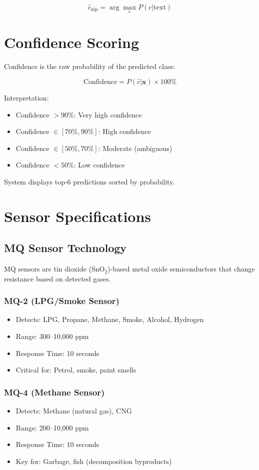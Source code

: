 \documentclass[10pt]{article}
\begin{document}
\[
\hat{c}_{\text{nlp}} = \arg\max_c P(c|\text{text})
\]

\section{Confidence Scoring}

Confidence is the raw probability of the predicted class:

\[
\text{Confidence} = P(\hat{c}|\mathbf{x}) \times 100\%
\]

Interpretation:
\begin{itemize}
    \item Confidence $> 90\%$: Very high confidence
    \item Confidence $\in [70\%, 90\%]$: High confidence
    \item Confidence $\in [50\%, 70\%]$: Moderate (ambiguous)
    \item Confidence $< 50\%$: Low confidence
\end{itemize}

System displays top-6 predictions sorted by probability.

\section{Sensor Specifications}

\subsection{MQ Sensor Technology}

MQ sensors are tin dioxide (SnO$_2$)-based metal oxide semiconductors that change resistance based on detected gases.

\subsubsection{MQ-2 (LPG/Smoke Sensor)}
\begin{itemize}
    \item Detects: LPG, Propane, Methane, Smoke, Alcohol, Hydrogen
    \item Range: 300–10,000 ppm
    \item Response Time: 10 seconds
    \item Critical for: Petrol, smoke, paint smells
\end{itemize}

\subsubsection{MQ-4 (Methane Sensor)}
\begin{itemize}
    \item Detects: Methane (natural gas), CNG
    \item Range: 200–10,000 ppm
    \item Response Time: 10 seconds
    \item Key for: Garbage, fish (decomposition byproducts)
\end{itemize}
\end{document}

